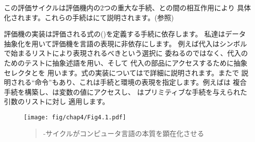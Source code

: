 この評価サイクルは評価機内の2つの重大な手続、との間の相互作用により
具体化されます。これらの手続はにて説明されます。(参照)



評価機の実装は評価される式の()を定義する手続に依存します。
私達はデータ抽象化を用いて評価機を言語の表現に非依存にします。
例えば代入はシンボルで始まるリストにより表現されるべきという選択に
委ねるのではなく、代入のためのテストに抽象述語を用い、そして
代入の部品にアクセスするために抽象セレクタとを
用います。式の実装についてはで詳細に説明されます。またで
説明される``命令''もあり、これは手続と環境の表現を指定します。例えばは
複合手続を構築し、は変数の値にアクセスし、
はプリミティブな手続を与えられた引数のリストに対し
適用します。

\begin{figure}[tb]
\label{Figure 4.1}
\centering
\begin{comment}
\heading{Figure 4.1:} The \code{eval}-\code{apply} cycle exposes the essence of a computer language.

\begin{example}
                           .,ad88888888baa,
                  _    ,d8P"""        ""9888ba.      _
                 /  .a8"          ,ad88888888888a   |\
               /   aP'          ,88888888888888888a   \
              /  ,8"           ,88888888888888888888,  \
             |  ,8'            (888888888888888888888, |
            /  ,8'             `8888888888888888888888  \
            |  8)               `888888888888888888888, |
Procedure,  |  8                  "88888 Apply 8888888) | Expression
Arguments   |  8     Eval          `888888888888888888) | Environment
            |  8)                    "8888888888888888  |
            \  (b                     "88888888888888'  /
             | `8,                     8888888888888)  |
             \  "8a                   ,888888888888)  /
              \   V8,                 d88888888888"  /
              _\| `8b,             ,d8888888888P' _/
                     `V8a,       ,ad8888888888P'
                        ""88888888888888888P"
                             """"""""""""

                               [graphic by Normand Veillux, modified]
\end{example}
\end{comment}
\texttt{[image: fig/chap4/Fig4.1.pdf]}
\begin{quote}
 -サイクルがコンピュータ言語の本質を顕在化させる
\end{quote}
\end{figure}



